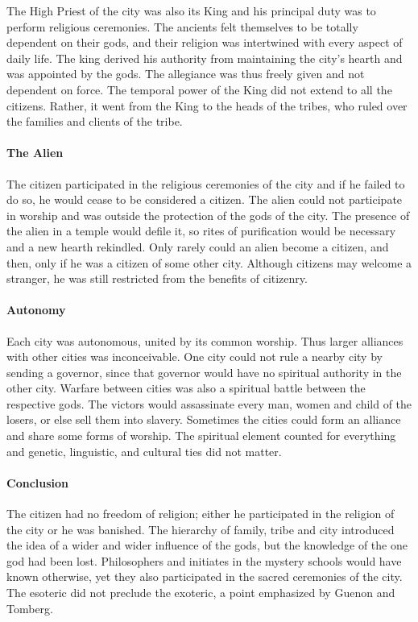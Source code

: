 The High Priest of the city was also its King and his principal duty was to perform religious ceremonies. The ancients felt themselves to be totally dependent on their gods, and their religion was intertwined with every aspect of daily life. The king derived his authority from maintaining the city's hearth and was appointed by the gods. The allegiance was thus freely given and not dependent on force. The temporal power of the King did not extend to all the citizens. Rather, it went from the King to the heads of the tribes, who ruled over the families and clients of the tribe.

\paragraph{The Alien}
The citizen participated in the religious ceremonies of the city and if he failed to do so, he would cease to be considered a citizen. The alien could not participate in worship and was outside the protection of the gods of the city. The presence of the alien in a temple would defile it, so rites of purification would be necessary and a new hearth rekindled. Only rarely could an alien become a citizen, and then, only if he was a citizen of some other city. Although citizens may welcome a stranger, he was still restricted from the benefits of citizenry.

\paragraph{Autonomy}
Each city was autonomous, united by its common worship. Thus larger alliances with other cities was inconceivable. One city could not rule a nearby city by sending a governor, since that governor would have no spiritual authority in the other city. Warfare between cities was also a spiritual battle between the respective gods. The victors would assassinate every man, women and child of the losers, or else sell them into slavery. Sometimes the cities could form an alliance and share some forms of worship. The spiritual element counted for everything and genetic, linguistic, and cultural ties did not matter.

\paragraph{Conclusion}
The citizen had no freedom of religion; either he participated in the religion of the city or he was banished. The hierarchy of family, tribe and city introduced the idea of a wider and wider influence of the gods, but the knowledge of the one god had been lost. Philosophers and initiates in the mystery schools would have known otherwise, yet they also participated in the sacred ceremonies of the city. The esoteric did not preclude the exoteric, a point emphasized by Guenon and Tomberg.

